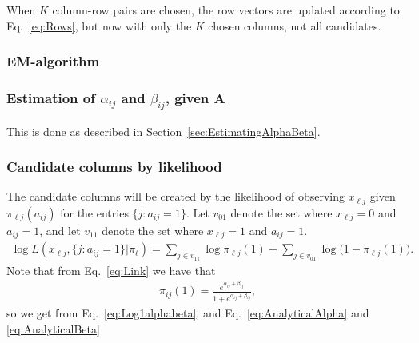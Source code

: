 \documentclass[12pt]{article}
\begin{document}
When $K$ column-row pairs are chosen, the row vectors are updated according to Eq.~\ref{eq:Rows}, but now with only the $K$ chosen columns, not all candidates. 

\subsubsection{EM-algorithm} %

\subsubsection*{Estimation of $\alpha_{ij}$ and $\beta_{ij}$, given $\mathbf{A}$}
This is done as described in Section~\ref{sec:EstimatingAlphaBeta}. 

\subsubsection*{Candidate columns by likelihood} %

The candidate columns will be created by the likelihood of observing ${x}_{\ell j}$ given $\pi_{\ell j}(a_{ij})$ for the entries $\{j : a_{ij} = 1\}$.
Let $v_{01}$ denote the set where  ${x}_{\ell j} = 0$ and $ a_{ij} = 1$,  and let $v_{11}$ denote the set where ${x}_{\ell j} = 1$ and $ a_{ij} = 1$.
\begin{align}
  \log L(x_{\ell j}, \{j : a_{ij} = 1\} | \pi_\ell) = \sum_{j \in v_{11}} \log \pi_{\ell j}(1) + \sum_{j \in v_{01}} \log \big ( 1 - \pi_{\ell j}(1) \big ).
\end{align} 
Note that from Eq.~\ref{eq:Link} we have that 
\begin{align*}
 \pi_{ij}(1) = \frac{e^{\alpha_{ij} + \beta_{ij}}}{1 + e^{\alpha_{ij} + \beta_{ij}}},
\end{align*}
so we get from Eq.~\ref{eq:Log1alphabeta}, and Eq.~\ref{eq:AnalyticalAlpha} and \ref{eq:AnalyticalBeta}
\end{document}
